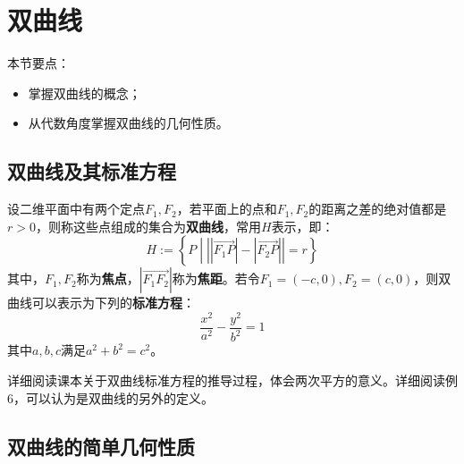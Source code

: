 \section{双曲线}

本节要点：
\begin{itemize}
    \item 掌握双曲线的概念；
    \item 从代数角度掌握双曲线的几何性质。
\end{itemize}

\subsection{双曲线及其标准方程}

\begin{definition}[双曲线]
设二维平面中有两个定点$F_1,F_2$，若平面上的点和$F_1,F_2$的距离之差的绝对值都是$r>0$，则称这些点组成的集合为{\bf 双曲线}，常用$H$表示，即：
\[
H:=\left\{ P \middle| \left| \left| \overrightarrow{F_1P} \right|-\left| \overrightarrow{F_2P} \right| \right|=r \right\}
\]
其中，$F_1,F_2$称为{\bf 焦点}，$\left| \overrightarrow{F_1F_2} \right|$称为{\bf 焦距}。若令$F_1=\left( -c,0 \right) ,F_2=\left( c,0 \right) $，则双曲线可以表示为下列的{\bf 标准方程}：
\[
\frac{x^2}{a^2}-\frac{y^2}{b^2}=1
\]
其中$a,b,c$满足$a^2+b^2=c^2$。
\end{definition}

\begin{figure}[h]
\centering
{}
\end{figure}

\begin{tcolorbox}
详细阅读课本关于双曲线标准方程的推导过程，体会两次平方的意义。详细阅读例6，可以认为是双曲线的另外的定义。
\end{tcolorbox}

\subsection{双曲线的简单几何性质}

